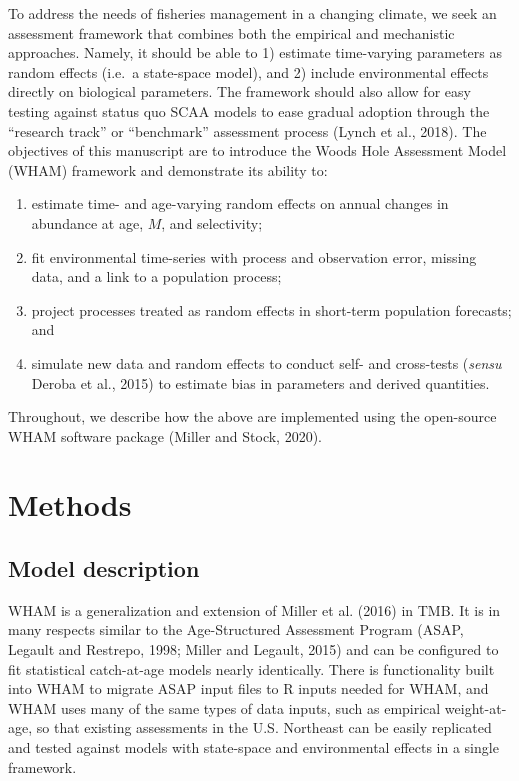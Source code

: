 \documentclass[]{article}
\providecommand{\tightlist}{%
  \setlength{\itemsep}{0pt}\setlength{\parskip}{0pt}}
\begin{document}
To address the needs of fisheries management in a changing climate, we
seek an assessment framework that combines both the empirical and
mechanistic approaches. Namely, it should be able to 1) estimate
time-varying parameters as random effects (i.e.~a state-space model),
and 2) include environmental effects directly on biological parameters.
The framework should also allow for easy testing against status quo SCAA
models to ease gradual adoption through the ``research track'' or
``benchmark'' assessment process (Lynch et al., 2018). The objectives of
this manuscript are to introduce the Woods Hole Assessment Model (WHAM)
framework and demonstrate its ability to:

\begin{enumerate}
\def\labelenumi{\arabic{enumi}.}
\tightlist
\item
  estimate time- and age-varying random effects on annual changes in
  abundance at age, \(M\), and selectivity;
\item
  fit environmental time-series with process and observation error,
  missing data, and a link to a population process;
\item
  project processes treated as random effects in short-term population
  forecasts; and
\item
  simulate new data and random effects to conduct self- and cross-tests
  (\emph{sensu} Deroba et al., 2015) to estimate bias in parameters and
  derived quantities.
\end{enumerate}

Throughout, we describe how the above are implemented using the
open-source WHAM software package (Miller and Stock, 2020).

\hypertarget{methods}{%
\section{Methods}\label{methods}}

\hypertarget{model-description}{%
\subsection{Model description}\label{model-description}}

WHAM is a generalization and extension of Miller et al. (2016) in TMB.
It is in many respects similar to the Age-Structured Assessment Program
(ASAP, Legault and Restrepo, 1998; Miller and Legault, 2015) and can be
configured to fit statistical catch-at-age models nearly identically.
There is functionality built into WHAM to migrate ASAP input files to R
inputs needed for WHAM, and WHAM uses many of the same types of data
inputs, such as empirical weight-at-age, so that existing assessments in
the U.S. Northeast can be easily replicated and tested against models
with state-space and environmental effects in a single framework.
\end{document}
